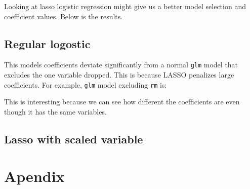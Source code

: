 \documentclass[]{article}
\begin{document}
Looking at lasso logistic regression might give us a better model
selection and coefficient values. Below is the results.

\hypertarget{regular-logostic}{%
\subsection{Regular logostic}\label{regular-logostic}}

This models coefficients deviate significantly from a normal
\texttt{glm} model that excludes the one variable dropped. This is
because LASSO penalizes large coefficients. For example, \texttt{glm}
model excluding \texttt{rm} is:

This is interesting because we can see how different the coefficients
are even though it has the same variables.

\hypertarget{lasso-with-scaled-variable}{%
\subsection{Lasso with scaled
variable}\label{lasso-with-scaled-variable}}

\hypertarget{apendix}{%
\section{Apendix}\label{apendix}}
\end{document}
